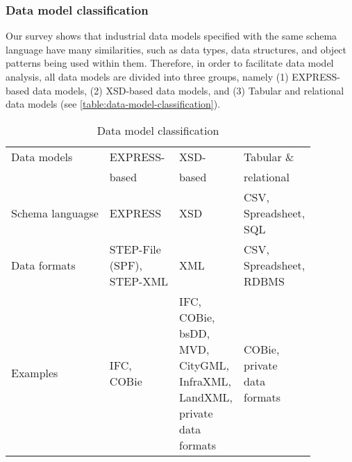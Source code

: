 \subsubsection{Data model classification}\label{sec:data-model-classification}

Our survey shows that industrial data models specified with the same schema language have many similarities, such as data types, data structures, and object patterns being used within them.
Therefore, in order to facilitate data model analysis, all data models are divided into three groups, namely (1) EXPRESS-based data models, (2) XSD-based data models, and (3) Tabular and relational data models (see \autoref{table:data-model-classification}).


\begin{table}
    \centering
    \caption{Data model classification}
    \begin{tabularx}{\columnwidth}{llll}
        \hline
            Data models &
            EXPRESS- &
            XSD- &
            Tabular \&
        \\
             &
            based &
            based &
            relational
        \\
        \hline
            Schema languagse &
            EXPRESS &
            XSD &
            \specialcell[t]{CSV,\\Spreadsheet,\\SQL}
        \\            
        \hline
            Data formats &
            \specialcell[t]{STEP-File\\(SPF),\\STEP-XML} &
            XML &
            \specialcell[t]{CSV,\\Spreadsheet,\\RDBMS}
        \\            
        \hline
            Examples &
            \specialcell[t]{IFC,\\COBie} &
            \specialcell[t]{IFC,\\COBie,\\bsDD,\\MVD,\\CityGML,\\InfraXML,\\LandXML,\\private\\data\\formats} &
            \specialcell[t]{COBie,\\private\\data\\formats}
        \\
        \hline
    \end{tabularx}
    \label{table:data-model-classification}
\end{table}


